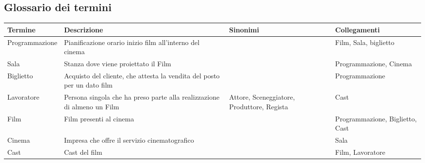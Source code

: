 \documentclass[10pt]{article}
\begin{document}
 	\subsection{Glossario dei termini}
 	\begin{tabular}{ |p{3cm}|p{4.5cm}|p{2.5cm}|p{3cm}|  }
 		\hline
 		\rowcolor{lightgray}
 		\textbf{Termine} & \textbf{Descrizione} & \textbf{Sinonimi} & \textbf{Collegamenti} \\
 		\hline
 		Programmazione                         & Pianificazione orario inizio film all'interno del cinema                &                                                                                      & Film, Sala, biglietto                                                             \\ \hline
 		Sala                                   & Stanza dove viene proiettato il Film                                    &                                                                                      & Programmazione, Cinema \\ \hline
 		Biglietto                              & Acquisto del cliente, che attesta la vendita del posto per un dato film &                                                                                      & Programmazione \\ \hline
 		Lavoratore                                & Persona singola che ha preso parte alla realizzazione di almeno un Film                  & Attore, Sceneggiatore, Produttore, Regista & Cast                                                                        \\ \hline
 		Film                                   & Film presenti al cinema                                                 &                                                                                      & Programmazione, Biglietto, Cast        \\ \hline
 		Cinema                                   &    Impresa che offre il servizio cinematografico &                                                                                      & Sala        \\ \hline
 		Cast                                   &    Cast del film &                                                                                      & Film, Lavoratore        \\ \hline
 	\end{tabular}
\end{document}
